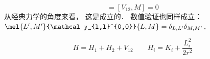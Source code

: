 
\begin{equation}
[V_{12}, L^2] = [V_{12}, M] = 0
\end{equation}
从经典力学的角度来看， 这是成立的． 数值验证也同样成立： $\mel{L',M'}{\mathcal y_{l,l}^{0,0}}{L,M} = \delta_{L,L'}\delta_{M,M'}$．

\begin{equation}
H = H_1 + H_2 + V_{12} \qquad H_i = K_i + \frac{L_i^2}{2r^2}
\end{equation}

